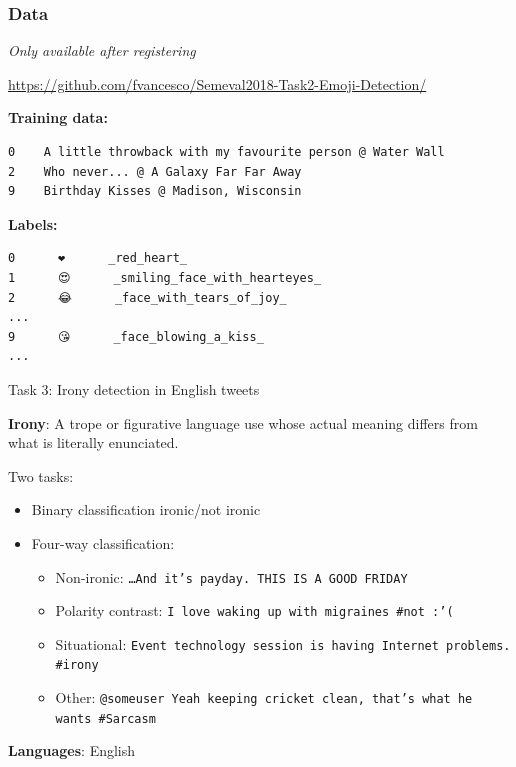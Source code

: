 \documentclass[10pt, compress]{beamer}
\begin{document}
\begin{frame}[fragile]
\frametitle{Data}

\emph{Only available after registering}

\url{https://github.com/fvancesco/Semeval2018-Task2-Emoji-Detection/}

{\small
\textbf{Training data:}
\begin{verbatim}
0    A little throwback with my favourite person @ Water Wall
2    Who never... @ A Galaxy Far Far Away
9    Birthday Kisses @ Madison, Wisconsin
\end{verbatim}
}

\textbf{Labels:}
{\small
\begin{verbatim}
0      ❤      _red_heart_      
1      😍      _smiling_face_with_hearteyes_      
2      😂      _face_with_tears_of_joy_      
...
9      😘      _face_blowing_a_kiss_      
...
\end{verbatim}
}


\end{frame}




\begin{frame}{Task 3: Irony detection in English tweets}

\textbf{Irony}: A trope or figurative language use whose actual meaning differs from what is literally enunciated.

Two tasks:
\begin{itemize}
  \item Binary classification ironic/not ironic
  \item Four-way classification: 
  \begin{itemize}
     \item[0)] Non-ironic: {\tt \ldots And it's payday. THIS IS A GOOD FRIDAY}
     \item[1)] Polarity contrast: {\tt I love waking up with migraines \#not :'(}
     \item[2)] Situational: {\tt Event technology session is having Internet problems. \#irony}
     \item[3)] Other: {\tt @someuser Yeah keeping cricket clean, that's what he wants \#Sarcasm}
  \end{itemize}
\end{itemize}

\textbf{Languages}: English

\end{frame}
\end{document}
